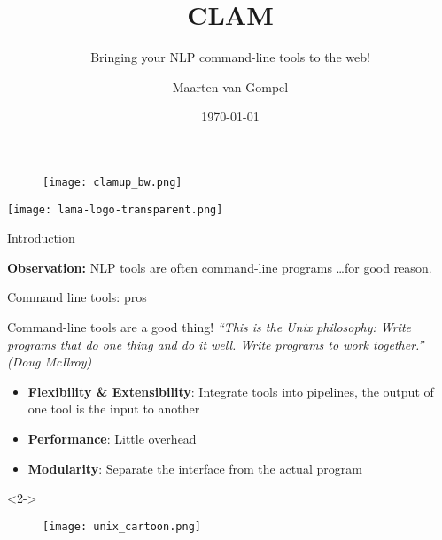 \documentclass[xcolor=table,10pt,t]{beamer}
\title{CLAM}
\subtitle{Bringing your NLP command-line tools to the web!}
\date{\today}
\author{Maarten van Gompel}
\begin{document}
\begin{frame}
  \titlepage
        \begin{figure}
          \texttt{[image: clamup\_bw.png]}
        \end{figure}
        \vspace{3.5cm}
      \texttt{[image: lama-logo-transparent.png]}
\end{frame}







\begin{frame}{Introduction}
  \begin{block}{}
    \textbf{Observation:} NLP tools are often command-line programs \ldots for
    good reason.
  \end{block}
\end{frame}


\begin{frame}{Command line tools: pros}
  \begin{block}{Command-line tools are a good thing!}
      \emph{``This is the Unix philosophy: Write programs that do one thing and do
      it well. Write programs to work together.'' (Doug McIlroy)}
      
      \begin{itemize}
        \item \textbf{Flexibility \& Extensibility}: Integrate tools into pipelines, the output of one tool is the
          input to another
        \item \textbf{Performance}: Little overhead
        \item \textbf{Modularity}: Separate the interface from the actual program
      \end{itemize}
      
  \end{block}

  \begin{block}{}<2->
        \begin{figure}
            \texttt{[image: unix\_cartoon.png]}
        \end{figure}
  \end{block}
\end{frame}
\end{document}
